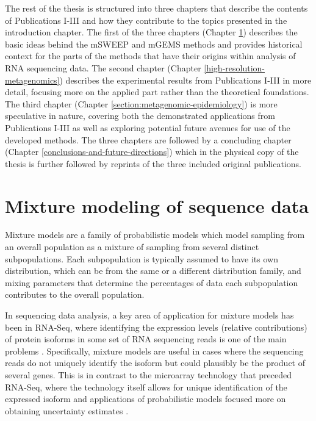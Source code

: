 \documentclass[officiallayout]{tktla}
\begin{document}
The rest of the thesis is structured into three chapters that describe
the contents of Publications I-III and how they contribute to the
topics presented in the introduction chapter. The first of the three
chapters (Chapter \ref{mixture-modelling-of-sequence-data}) describes
the basic ideas behind the mSWEEP and mGEMS methods and provides
historical context for the parts of the methods that have their
origins within analysis of RNA sequencing data. The second chapter
(Chapter \ref{high-resolution-metagenomics}) describes the
experimental results from Publications I-III in more detail, focusing
more on the applied part rather than the theoretical foundations. The
third chapter (Chapter \ref{section:metagenomic-epidemiology}) is more
speculative in nature, covering both the demonstrated applications
from Publications I-III as well as exploring potential future avenues
for use of the developed methods. The three chapters are followed by a
concluding chapter (Chapter \ref{conclusions-and-future-directions})
which in the physical copy of the thesis is further followed by
reprints of the three included original publications.

\chapter{Mixture modeling of sequence data}
\label{mixture-modelling-of-sequence-data}

Mixture models are a family of probabilistic models which model
sampling from an overall population as a mixture of sampling from
several distinct subpopulations. Each subpopulation is typically
assumed to have its own distribution, which can be from the same or a
different distribution family, and mixing parameters that determine
the percentages of data each subpopulation contributes to the overall
population.

In sequencing data analysis, a key area of application for mixture
models has been in RNA-Seq, where identifying the expression levels
(relative contributions) of protein isoforms in some set of RNA
sequencing reads is one of the main problems
\citep{garber2011computational, wang2009rna}. Specifically, mixture
models are useful in cases where the sequencing reads do not uniquely
identify the isoform but could plausibly be the product of several
genes. This is in contrast to the microarray technology that preceded
RNA-Seq, where the technology itself allows for unique identification
of the expressed isoform and applications of probabilistic models
focused more on obtaining uncertainty estimates
\citep{rattray2006propagating, liu2007including}.
\end{document}
